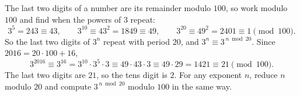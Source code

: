 The last two digits of a number are its remainder modulo $100$, so work modulo $100$ and find when the powers of $3$ repeat:
\[
3^5=243\equiv43,\qquad 3^{10}\equiv43^2=1849\equiv49,\qquad 3^{20}\equiv49^2=2401\equiv1\pmod{100}.
\]
So the last two digits of $3^n$ repeat with period $20$, and $3^n\equiv3^{\,n\bmod 20}$. Since $2016=20\cdot100+16$,
\[
3^{2016}\equiv3^{16}=3^{10}\cdot3^{5}\cdot3\equiv49\cdot43\cdot3\equiv49\cdot29=1421\equiv21\pmod{100}.
\]
The last two digits are $21$, so the tens digit is $\boxed{2}$. For any exponent $n$, reduce $n$ modulo $20$ and compute $3^{\,n\bmod20}$ modulo $100$ in the same way.
